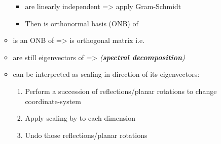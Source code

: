 \begin{itemize}
\begin{itemize}
\begin{itemize}
                              \item
                                     are linearly
                                    independent => apply Gram-Schmidt
                              \item
                                    Then  is
                                    orthonormal basis (ONB) of 
                        \end{itemize}
                  \item
                         is
                        an ONB of  =>
                         is
                        orthogonal matrix i.e.~
                  \item
                         are still eigenvectors
                        of  => 
                        \emph{(\textbf{spectral decomposition})}
                  \item
                         can be interpreted as scaling
                        in direction of its eigenvectors:

                        \begin{enumerate}
                              \item
                                    Perform a succession of reflections/planar rotations to change
                                    coordinate-system
                              \item
                                    Apply scaling by  to each dimension
                              \item
                                    Undo those reflections/planar rotations
                        \end{enumerate}
            \end{itemize}
\end{itemize}
